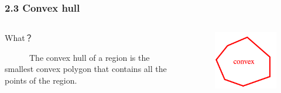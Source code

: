\documentclass[notheorems,serif,table,compress]{beamer}  %
\begin{document}
\begin{frame}        
\frametitle{2.3 Convex hull}
    \begin{columns}
        \begin{column}{0.4\linewidth}
{\color{blue}What？}\newline

~~~~~~The convex hull of a region is the smallest convex polygon that contains all the points of the region.
        \end{column}
        \begin{column}{0.6\linewidth}
            \begin{tcolorbox}[colback=red!5,colframe=blue!75!black]
            \begin{figure}
              \centering
              \begin{minipage}[t]{0.32\linewidth}
              \includegraphics[width=1.1\linewidth]{hull1}
              \end{minipage}
              \begin{minipage}[t]{0.3\linewidth}

\end{minipage}
\end{figure}
\end{tcolorbox}
\end{column}
\end{columns}
\end{frame}
\end{document}
